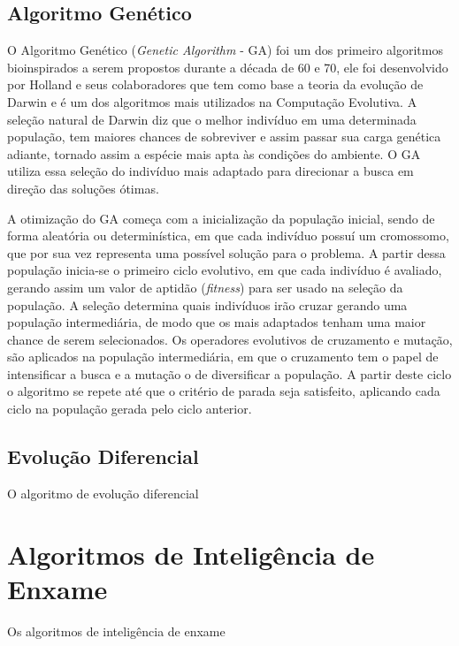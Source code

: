 \subsection{Algoritmo Genético}
\label{sec:genetic_algorithms}
O Algoritmo Genético (\textit{Genetic Algorithm} - GA) foi um dos primeiro algoritmos bioinspirados a serem propostos durante a década de 60 e 70, ele foi desenvolvido por Holland e seus colaboradores que tem como base a teoria da evolução de Darwin \cite{ga} e é um dos algoritmos mais utilizados na Computação Evolutiva. A seleção natural de Darwin diz que o melhor indivíduo em uma determinada população, tem maiores chances de sobreviver e assim passar sua carga genética adiante, tornado assim a espécie mais apta às condições do ambiente. O GA utiliza essa seleção do indivíduo mais adaptado para direcionar a busca em direção das soluções ótimas.

A otimização do GA começa com a inicialização da população inicial, sendo de forma aleatória ou determinística, em que cada indivíduo possuí um cromossomo, que por sua vez representa uma possível solução para o problema. A partir dessa população inicia-se o primeiro ciclo evolutivo, em que cada indivíduo é avaliado, gerando assim um valor de aptidão (\textit{fitness}) para ser usado na seleção da população. A seleção determina quais indivíduos irão cruzar gerando uma população intermediária, de modo que os mais adaptados tenham uma maior chance de serem selecionados. Os operadores evolutivos de cruzamento e mutação, são aplicados na população intermediária, em que o cruzamento tem o papel de intensificar a busca e a mutação o de diversificar a população. A partir deste ciclo o algoritmo se repete até que o critério de parada seja satisfeito, aplicando cada ciclo na população gerada pelo ciclo anterior.

\subsection{Evolução Diferencial}
\label{sec:diferencial_evolution}
O algoritmo de evolução diferencial


\section{Algoritmos de Inteligência de Enxame}
\label{sec:swarm_intelligence_algorithms}
Os algoritmos de inteligência de enxame

